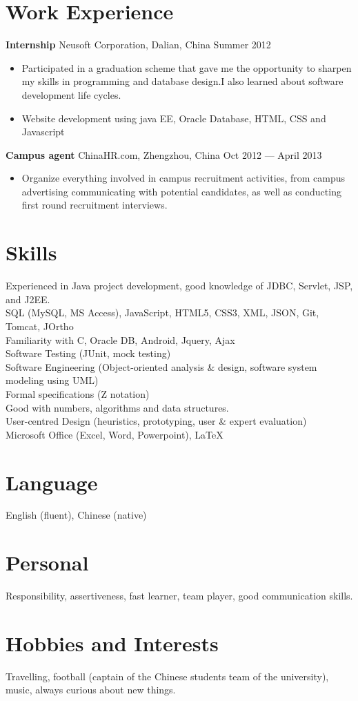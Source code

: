 \documentclass[margin]{res}
\begin{document}
\begin{resume}
\section{Work Experience}
 {\bf Internship } Neusoft Corporation, Dalian, China \hfill Summer  2012
 \begin{itemize} \itemsep -2pt  %
  \item Participated in a graduation scheme that gave me the opportunity to
  sharpen my skills in programming and database design.I also learned about
  software development life cycles.
 \item Website development using java EE, Oracle Database, HTML, CSS and
 Javascript
 \end{itemize}  
{\bf Campus agent} ChinaHR.com, Zhengzhou, China \hfill  Oct 2012 --- April 2013
\begin{itemize} \itemsep -2pt %
\item Organize everything involved in campus recruitment activities, from campus
advertising communicating with potential candidates, as well as conducting first round recruitment interviews.
\end{itemize}
\section{Skills}
 Experienced in Java project development, good knowledge of JDBC, Servlet, JSP,
 and J2EE.\\
SQL (MySQL, MS Access), JavaScript, HTML5, CSS3, XML, JSON, Git, Tomcat, JOrtho\\
Familiarity with C, Oracle DB, Android, Jquery, Ajax\\
Software Testing (JUnit, mock testing)\\
Software Engineering (Object-oriented analysis \& design, software system
modeling using UML)\\ 
Formal specifications (Z notation)\\ 
Good with numbers, algorithms and data structures.\\
User-centred Design (heuristics, prototyping, user \& expert evaluation)\\
Microsoft Office (Excel, Word, Powerpoint), \LaTeX
\section{Language} English (fluent), Chinese (native)
\section{Personal} Responsibility, assertiveness, fast learner, team player,
good communication skills.
\section{Hobbies and Interests}
Travelling, football (captain of the Chinese students team of
the university), music, always curious about new things.
\end{resume} 
\end{document}
